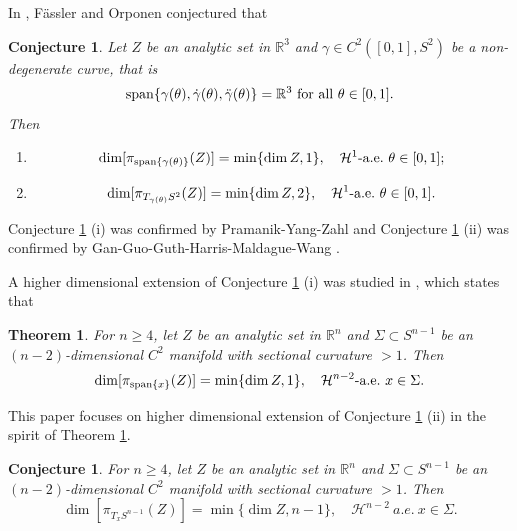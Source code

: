 \documentclass[11pt,a4paper,reqno]{amsart}
\newcommand{\R}{\mathbb{R}}
\newcommand{\calH}{\mathcal{H}}
\newcommand{\1}{\mathbf{1}}
\def\gz{{\gamma}}
\numberwithin{equation}{section}
\theoremstyle{plain}
\newtheorem{thm}[equation]{Theorem}
\newtheorem{conjecture}[equation]{Conjecture}
\theoremstyle{definition}
\theoremstyle{remark}
\begin{document}
In \cite{FasslerOrponen14}, F\"{a}ssler and Orponen conjectured that
\begin{conjecture} \label{conjfo}
   Let $Z$ be an analytic set in $\R^3$ and $\gz \in C^2([0,1], S^2)$ be a non-degenerate curve, that is
   \begin{equation}\label{nondeg0}
    {\rm span}\{ \gamma(\theta), \dot \gamma(\theta), \ddot \gamma(\theta)\}=\mathbb{R}^3 \text{  for all }  \theta \in [0,1].
\end{equation}
    Then
    \begin{enumerate}
      \item[(i)]
 \begin{equation*}
   \dim [\pi_{{\rm span}\{\gamma(\theta)\}}(Z)]  = \min\{\dim Z, 1 \}, \quad \calH^1\mbox{-\rm a.e.} \ \theta\in [0,1];
\end{equation*}
      \item[(ii)]
      \begin{equation*}
   \dim [\pi_{T_{\gamma(\theta)}S^2}(Z)]  = \min\{\dim Z, 2 \}, \quad \calH^1\mbox{-\rm a.e.} \ \theta\in [0,1].
\end{equation*}
    \end{enumerate}
\end{conjecture}
Conjecture \ref{conjfo} (i) was confirmed by Pramanik-Yang-Zahl \cite{2022arXiv220702259P} and Conjecture \ref{conjfo} (ii) was confirmed by Gan-Guo-Guth-Harris-Maldague-Wang \cite{gan2024}.

A higher
dimensional extension of Conjecture \ref{conjfo} (i) was studied in \cite{LIU2025}, which states that
\begin{thm}\label{2025}
  For $n \ge 4$, let $Z$ be an analytic set in $\R^n$ and $\Sigma \subset S^{n-1}$ be an $(n-2)$-dimensional $C^2$ manifold with sectional curvature $>1$.
    Then
 \begin{equation*}
   \dim [\pi_{{\rm span}\{x\}}(Z)]  = \min\{\dim Z, 1 \}, \quad \calH^{n-2} \mbox{-\rm a.e.} \ x\in \Sigma.
\end{equation*}
\end{thm}

This paper focuses on higher dimensional extension of Conjecture \ref{conjfo} (ii) in the spirit of Theorem \ref{2025}.
\begin{conjecture} \label{conjl}
   For $n \ge 4$, let $Z$ be an analytic set in $\R^n$ and $\Sigma \subset S^{n-1}$ be an $(n-2)$-dimensional $C^2$ manifold with sectional curvature $>1$.
    Then
      \begin{equation*}
   \dim [\pi_{T_{x}S^{n-1}}(Z)]  = \min\{\dim Z, n-1 \}, \quad \calH^{n-2} \ a.e. \ x\in \Sigma.
\end{equation*}
\end{conjecture}
\end{document}
